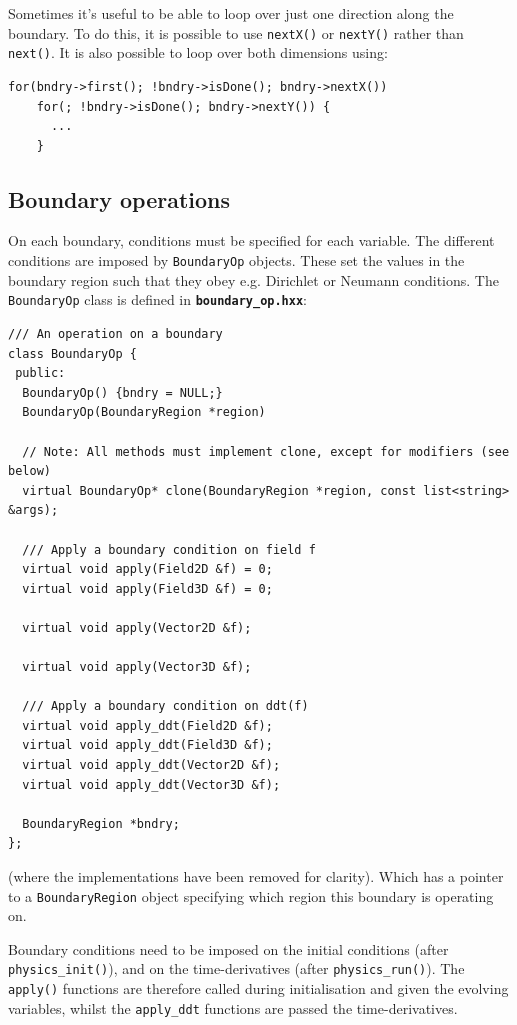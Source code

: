 \documentclass[12pt]{article}
\newcommand{\code}[1]{\texttt{#1}}
\newcommand{\file}[1]{\texttt{\bf #1}}
\begin{document}
Sometimes it's useful to be able to loop over just one direction along the
boundary. To do this, it is possible to use \code{nextX()} or \code{nextY()}
rather than \code{next()}. It is also possible to loop over both dimensions
using:
%
\begin{lstlisting}[numbers=none]
  for(bndry->first(); !bndry->isDone(); bndry->nextX())
    for(; !bndry->isDone(); bndry->nextY()) {
      ...
    }
\end{lstlisting}
%



\subsection{Boundary operations}
%
On each boundary, conditions must be specified for each variable.  The
different conditions are imposed by \code{BoundaryOp} objects.  These set the
values in the boundary region such that they obey e.g.  Dirichlet or Neumann
conditions. The \code{BoundaryOp} class is defined in \file{boundary\_op.hxx}:
%
%
\begin{lstlisting}[firstnumber=21]
/// An operation on a boundary
class BoundaryOp {
 public:
  BoundaryOp() {bndry = NULL;}
  BoundaryOp(BoundaryRegion *region)

  // Note: All methods must implement clone, except for modifiers (see below)
  virtual BoundaryOp* clone(BoundaryRegion *region, const list<string> &args);

  /// Apply a boundary condition on field f
  virtual void apply(Field2D &f) = 0;
  virtual void apply(Field3D &f) = 0;

  virtual void apply(Vector2D &f);

  virtual void apply(Vector3D &f);

  /// Apply a boundary condition on ddt(f)
  virtual void apply_ddt(Field2D &f);
  virtual void apply_ddt(Field3D &f);
  virtual void apply_ddt(Vector2D &f);
  virtual void apply_ddt(Vector3D &f);

  BoundaryRegion *bndry;
};
\end{lstlisting}
%
(where the implementations have been removed for clarity).  Which has a pointer
to a \code{BoundaryRegion} object specifying which region this boundary is
operating on.

Boundary conditions need to be imposed on the initial conditions (after
\code{physics\_init()}), and on the time-derivatives (after
\code{physics\_run()}). The \code{apply()} functions are therefore called
during initialisation and given the evolving variables, whilst the
\code{apply\_ddt} functions are passed the time-derivatives.
\end{document}
